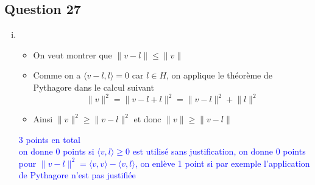 \documentclass[11pt, a4paper, oneside]{article}
\begin{document}
\subsection*{Question 27}
\begin{enumerate}[i)]
\item 
\begin{itemize}
\item 
On veut montrer que $\lVert v-l \rVert \leq \lVert v \rVert$
\item Comme on a $\langle v-l,l \rangle = 0$ car $l \in H$, on applique le théorème de Pythagore dans le calcul suivant
$$\lVert v \rVert^2 = \lVert v-l + l \rVert^2 = \lVert v-l \rVert^2 + \lVert l \rVert^2$$
\item Ainsi $\lVert v \rVert^2 \geq \lVert v-l \rVert^2$ et donc $\lVert v \rVert \geq \lVert v-l \rVert$ \\
\end{itemize}
\textcolor{blue}{3 points en total \\ on donne 0 points si $\langle v,l \rangle \geq 0$ est utilisé sans justification, on donne 0 points pour $\lVert v-l \rVert^2 = \langle v,v \rangle - \langle v,l \rangle$, on enlève 1 point si par exemple l'application de Pythagore n'est pas justifiée}


\end{enumerate}
\end{document}
